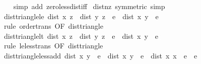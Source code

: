 \begin{isabellebody}
\ \ %
\endisadelimproof
%
\isatagproof
{}\isamarkupfalse%
\ {\isacharparenleft}{\kern0pt}simp\ add{\isacharcolon}{\kern0pt}\ zero{\isacharunderscore}{\kern0pt}less{\isacharunderscore}{\kern0pt}dist{\isacharunderscore}{\kern0pt}iff{\isacharparenright}{\kern0pt}%
\endisatagproof
{\isafoldproof}%
%
\isadelimproof
\isanewline
%
\endisadelimproof
\isanewline
{}\isamarkupfalse%
\ dist{\isacharunderscore}{\kern0pt}nz\ {\isacharbrackleft}{\kern0pt}symmetric{\isacharcomma}{\kern0pt}\ simp{\isacharbrackright}{\kern0pt}\isanewline
\isanewline
{}\isamarkupfalse%
\ dist{\isacharunderscore}{\kern0pt}triangle{\isacharunderscore}{\kern0pt}le{\isacharcolon}{\kern0pt}\ {\isachardoublequoteopen}dist\ x\ z\ {\isacharplus}{\kern0pt}\ dist\ y\ z\ {\isasymle}\ e\ {\isasymLongrightarrow}\ dist\ x\ y\ {\isasymle}\ e{\isachardoublequoteclose}\isanewline
%
\isadelimproof
\ \ %
\endisadelimproof
%
\isatagproof
{}\isamarkupfalse%
\ {\isacharparenleft}{\kern0pt}rule\ order{\isacharunderscore}{\kern0pt}trans\ {\isacharbrackleft}{\kern0pt}OF\ dist{\isacharunderscore}{\kern0pt}triangle{}{\isacharbrackright}{\kern0pt}{\isacharparenright}{\kern0pt}%
\endisatagproof
{\isafoldproof}%
%
\isadelimproof
\isanewline
%
\endisadelimproof
\isanewline
{}\isamarkupfalse%
\ dist{\isacharunderscore}{\kern0pt}triangle{\isacharunderscore}{\kern0pt}lt{\isacharcolon}{\kern0pt}\ {\isachardoublequoteopen}dist\ x\ z\ {\isacharplus}{\kern0pt}\ dist\ y\ z\ {\isacharless}{\kern0pt}\ e\ {\isasymLongrightarrow}\ dist\ x\ y\ {\isacharless}{\kern0pt}\ e{\isachardoublequoteclose}\isanewline
%
\isadelimproof
\ \ %
\endisadelimproof
%
\isatagproof
{}\isamarkupfalse%
\ {\isacharparenleft}{\kern0pt}rule\ le{\isacharunderscore}{\kern0pt}less{\isacharunderscore}{\kern0pt}trans\ {\isacharbrackleft}{\kern0pt}OF\ dist{\isacharunderscore}{\kern0pt}triangle{}{\isacharbrackright}{\kern0pt}{\isacharparenright}{\kern0pt}%
\endisatagproof
{\isafoldproof}%
%
\isadelimproof
\isanewline
%
\endisadelimproof
\isanewline
{}\isamarkupfalse%
\ dist{\isacharunderscore}{\kern0pt}triangle{\isacharunderscore}{\kern0pt}less{\isacharunderscore}{\kern0pt}add{\isacharcolon}{\kern0pt}\ {\isachardoublequoteopen}dist\ x{}\ y\ {\isacharless}{\kern0pt}\ e{}\ {\isasymLongrightarrow}\ dist\ x{}\ y\ {\isacharless}{\kern0pt}\ e{}\ {\isasymLongrightarrow}\ dist\ x{}\ x{}\ {\isacharless}{\kern0pt}\ e{}\ {\isacharplus}{\kern0pt}\ e{}{\isachardoublequoteclose}\isanewline

\end{isabellebody}
